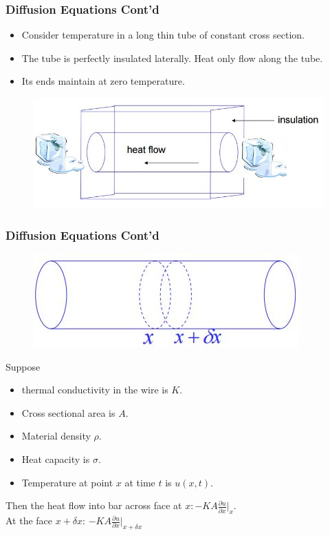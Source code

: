 \documentclass{beamer}
\begin{document}
\begin{frame}
\frametitle{Diffusion Equations Cont'd}
\begin{itemize}
\item Consider temperature in a long thin tube of constant cross section.
\item The tube is perfectly insulated laterally. Heat only flow along the tube.
\item Its ends maintain at zero temperature.
\end{itemize}
\begin{figure}
\includegraphics[width=0.6\linewidth]{heat2.jpg}
\end{figure}
\end{frame}

\begin{frame}
\frametitle{Diffusion Equations Cont'd}
\begin{figure}
\includegraphics[width=0.4\linewidth]{heat3.jpg}
\end{figure}
Suppose
\begin{itemize}
\item thermal conductivity in the wire is $K$.
\item Cross sectional area is $A$.
\item Material density $\rho$.
\item Heat capacity is $\sigma$.
\item Temperature at point $x$ at time $t$ is $u(x,t)$.
\end{itemize}
Then the heat flow into bar across face at $x: -KA\frac{\partial u}{\partial x}|_x$.\\
At the face $x+\delta x$: $-KA\frac{\partial u}{\partial x}|_{x+\delta x}$
\end{frame}
\end{document}
